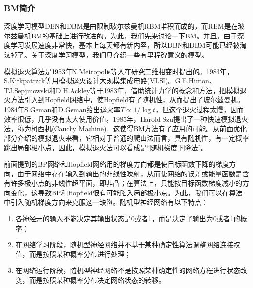 {        \subsubsection{BM简介}
            \par
            深度学习模型DBN和DBM是由限制玻尔兹曼机RBM堆积而成的，而RBM是在玻尔兹曼机BM的基础上进行改进的，为此，我们先来讨论一下BM。并且，由于深度学习发展速度非常快，基本上每天都有新内容，所以DBN和DBM可能已经被淘汰掉了。关于深度学习模型，我们只介绍一些有里程碑意义的模型。
            \par
            模拟退火算法是1953年N.Metropolis等人在研究二维相变时提出的。1983年，S.Kirkpatrzck等用模拟退火设计大规模集成电路(VLSI)。G.E.Hinton、TJ.Sepjmowski和D.H.Ackley等于1983年，借助统计力学的概念和方法，把模拟退火方法引入到Hopfield网络中，使Hopfield有了随机性，从而提出了玻尔兹曼机。1984年S.Geman和D.Geman给出退火率$T \propto 1/\log t$，但这个退火过程太慢，因而效率很低，几乎没有太大使用价值。1985年，Harold Szu提出了一种快速模拟退火法，称为柯西机(Cauchy Machine)，这使得BM方法有了应用的可能。从前面优化部分介绍的模拟退火来看，它相对于普通的爬山法而言，具有随机性，有一定概率跳出局部极小点，因此，模拟退火法可以看成是“随机梯度下降法”。
            \par
            前面提到的BP网络和Hopfield网络用的梯度方向都是使目标函数下降的梯度方向，由于网络中存在输入到输出的非线性映射，从而使网络的误差或能量函数是含有许多极小点的非线性超平面，即非凸；在算法上，只能按目标函数梯度减小的方向变化，这导致BP和Hopfield很有可能陷入局部极小点。为此，我们可以在算法中引入随机梯度方向来克服这一缺陷。随机型神经网络有以下特点：
            \begin{enumerate}
            \item 各神经元的输入不能决定其输出状态是0或者1，而是决定了输出为0或者1的概率；
            \item 在网络学习阶段，随机型神经网络并不基于某种确定性算法调整网络连接权值，而是按照某种概率分布进行处理；
            \item 在网络运行阶段，随机型神经网络不是按照某种确定性的网络方程进行状态改变，而是按照某种概率分布决定网络状态的转移。
            \end{enumerate}
}
